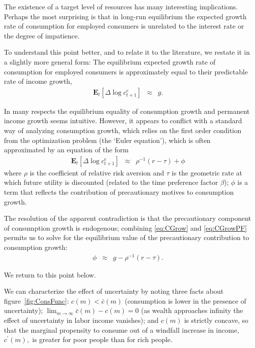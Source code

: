The existence of a target level of resources has many interesting
implications.  Perhaps the most surprising is that in long-run equilibrium the
expected growth rate of consumption for employed consumers is
unrelated to the interest rate or the degree of impatience.

To understand this point better, and to relate it to the literature,
we restate it in a slightly more general form:  The equilibrium
expected growth rate of consumption for employed consumers is
approximately equal to their predictable rate of income growth,
\begin{eqnarray}
  \label{eq:CGrow}
  \mathbf{E}_{t}[\Delta \log {c}_{t+1}^{e}] & \approx & g.
\end{eqnarray}

In many respects the equilibrium equality of consumption growth and
permanent income growth seems intuitive. However, it
appears to conflict with a standard way of analyzing consumption
growth, which relies on the first order condition from the
optimization problem (the `Euler equation'), which is often
approximated by an equation of the form
\begin{eqnarray}
  \label{eq:CGrowPF}
  \mathbf{E}_{t}[\Delta \log {c}^{e}_{t+1}] & \approx & \rho^{-1}(r-\tau) + \phi
\end{eqnarray}
where $\rho$ is the coefficient of relative risk aversion and $\tau$
is the geometric rate at which future utility is discounted (related
to the time preference factor $\beta$); $\phi$ is a term that
reflects the contribution of precautionary motives to consumption
growth.

The resolution of the apparent contradiction is that the precautionary
component of consumption growth is endogenous; combining
\eqref{eq:CGrow} and \eqref{eq:CGrowPF} permits us to solve for the
equilibrium value of the precautionary contribution to consumption
growth:
\begin{eqnarray}
  \label{eq:phi}
  \phi & \approx & g - \rho^{-1}(r-\tau).
\end{eqnarray}

We return to this point below.



We can characterize the effect of uncertainty by noting three facts
about figure~\ref{fig:ConsFunc}: $c({m}) < \bar{c}({m})$ (consumption is lower in the presence of uncertainty);
$\lim_{{m} \rightarrow \infty} \bar{c}({m})-c({m}) = 0$  (as wealth
approaches infinity the effect of uncertainty in labor income vanishes); and
$c({m})$ is strictly concave, so that the marginal propensity to consume
out of a windfall increase in income, $c^{\prime}({m}),$ is greater for
poor people than for rich people.

